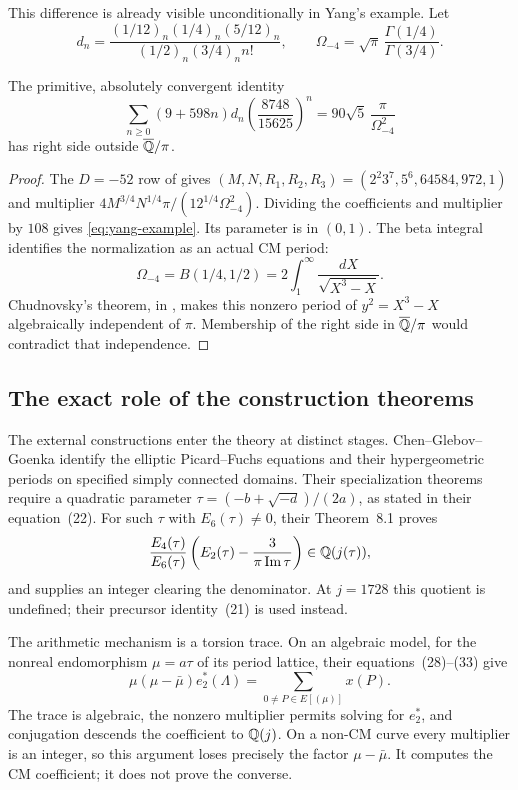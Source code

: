 This difference is already visible unconditionally in Yang's example.
Let
\[
 d_n=\frac{(1/12)_n(1/4)_n(5/12)_n}{(1/2)_n(3/4)_n n!},
 \qquad \Omega_{-4}=\sqrt\pi\,\frac{\Gamma(1/4)}{\Gamma(3/4)}.
\]
\begin{proposition}
The primitive, absolutely convergent identity
\begin{equation}\label{eq:yang-example}
 \sum_{n\ge0}(9+598n)d_n\left(\frac{8748}{15625}\right)^n
     =90\sqrt5\,\frac{\pi}{\Omega_{-4}^2}
\end{equation}
has right side outside $\overline{\mathbb Q}/\pi$.
\end{proposition}
\begin{proof}
The $D=-52$ row of \cite[Theorem~1]{Yang} gives
$(M,N,R_1,R_2,R_3)=(2^2 3^7,5^6,64584,972,1)$ and multiplier
$4M^{3/4}N^{1/4}\pi/(12^{1/4}\Omega_{-4}^2)$.
Dividing the coefficients and multiplier by $108$ gives
\eqref{eq:yang-example}. Its parameter is in $(0,1)$.
The beta integral identifies the normalization as an actual CM period:
\[
 \Omega_{-4}=B(1/4,1/2)
       =2\int_1^\infty\frac{dX}{\sqrt{X^3-X}}.
\]
Chudnovsky's theorem, in \cite[Corollary~6]{Waldschmidt}, makes this
nonzero period of $y^2=X^3-X$ algebraically independent of $\pi$.
Membership of the right side in $\overline{\mathbb Q}/\pi$ would contradict that
independence.
\end{proof}

\subsection{The exact role of the construction theorems}
\label{subsec:triangle-source-packets}
The external constructions enter the theory at distinct stages.
Chen--Glebov--Goenka \cite[Theorems~4.1--4.2 and 6.1--6.9]{CGG}
identify the elliptic Picard--Fuchs equations and their hypergeometric
periods on specified simply connected domains. Their specialization
theorems require a quadratic parameter
$\tau=(-b+\sqrt{-d})/(2a)$, as stated in their equation~(22).
For such $\tau$ with $E_6(\tau)\ne0$, their Theorem~8.1 proves
\[
 \frac{E_4(\tau)}{E_6(\tau)}
 \left(E_2(\tau)-\frac3{\pi\operatorname{Im}\tau}\right)
       \in\mathbb Q(j(\tau)),
\]
and supplies an integer clearing the denominator. At $j=1728$ this
quotient is undefined; their precursor identity~(21) is used instead.

The arithmetic mechanism is a torsion trace. On an algebraic model,
for the nonreal endomorphism $\mu=a\tau$ of its period lattice,
their equations~(28)--(33) give
\[
 \mu(\mu-\bar\mu)e_2^*(\Lambda)
       =\sum_{0\ne P\in E[(\mu)]}x(P).
\]
The trace is algebraic, the nonzero multiplier permits solving for
$e_2^*$, and conjugation descends the coefficient to $\mathbb Q(j)$.
On a non-CM curve every multiplier is an integer, so this argument
loses precisely the factor $\mu-\bar\mu$. It computes the CM
coefficient; it does not prove the converse.

